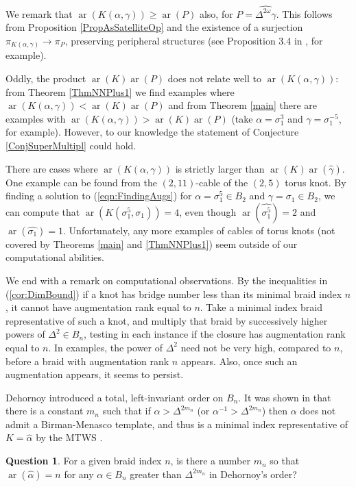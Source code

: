 \documentclass[11pt]{amsart}
\def\s{{\sigma}}
\def\ar{\operatorname{ar}}
\theoremstyle{definition}
\begin{document}
We remark that $\ar(K(\alpha,\gamma))\ge \ar(P)$ also, for $P=\widehat{\Delta^{2\omega}\gamma}$. This follows from Proposition \ref{PropAsSatelliteOp} and the existence of a surjection $\pi_{K(\alpha,\gamma)}\to\pi_P$, preserving peripheral structures (see Proposition 3.4 in \cite{SW}, for example). 

Oddly, the product $\ar(K)\ar(P)$ does not relate well to $\ar(K(\alpha,\gamma))$: from Theorem \ref{ThmNNPlus1} we find examples where $\ar(K(\alpha,\gamma))<\ar(K)\ar(P)$ and from Theorem \ref{main} there are examples with $\ar(K(\alpha,\gamma))>\ar(K)\ar(P)$ (take $\alpha=\s_1^3$ and $\gamma=\s_1^{-5}$, for example). However, to our knowledge the statement of Conjecture \ref{ConjSuperMultipl} could hold. 

There are cases where $\ar(K(\alpha,\gamma))$ is strictly larger than $\ar(K)\ar(\hat{\gamma})$. One example can be found from the $(2,11)$-cable of the $(2,5)$ torus knot. By finding a solution to (\ref{eqn:FindingAugs}) for $\alpha = \s_1^5\in B_2$ and $\gamma=\s_1\in B_2$, we can compute that $\ar(K(\s_1^5,\s_1)) = 4$, even though $\ar(\hat{\s_1^5})=2$ and $\ar(\hat{\s_1})=1$. Unfortunately, any more examples of cables of torus knots (not covered by Theorems \ref{main} and \ref{ThmNNPlus1}) seem outside of our computational abilities.

We end with a remark on computational observations. By the inequalities in (\ref{cor:DimBound}) if a knot has bridge number less than its minimal braid index $n$, it cannot have augmentation rank equal to $n$. Take a minimal index braid representative of such a knot, and multiply that braid by successively higher powers of $\Delta^2\in B_n$, testing in each instance if the closure has augmentation rank equal to $n$. In examples, the power of $\Delta^2$ need not be very high, compared to $n$, before a braid with augmentation rank $n$ appears. Also, once such an augmentation appears, it seems to persist. 

Dehornoy introduced a total, left-invariant order on $B_n$. It was shown in \cite{MN} that there is a constant $m_n$ such that if $\alpha>\Delta^{2m_n}$ (or $\alpha^{-1}>\Delta^{2m_n}$) then $\alpha$ does not admit a Birman-Menasco template, and thus is a minimal index representative of $K=\hat\alpha$ by the MTWS \cite{BirMen}. 

\newtheorem*{ques}{Question}
\begin{ques}For a given braid index $n$, is there a number $m_n$ so that $\ar(\hat\alpha)=n$ for any $\alpha\in B_n$ greater than $\Delta^{2m_n}$ in Dehornoy's order?
\end{ques}



\end{document}
